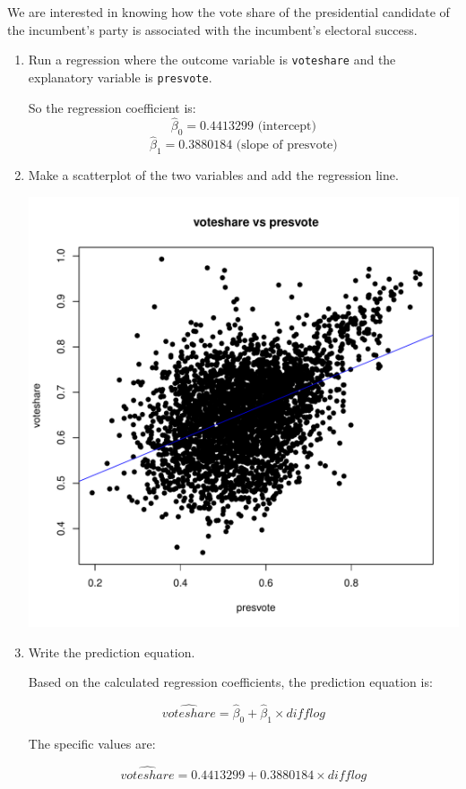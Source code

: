 \documentclass[12pt,letterpaper]{article}
\begin{document}
\noindent We are interested in knowing how the vote share of the presidential candidate of the incumbent's party is associated with the incumbent's electoral success.
	\vspace{.25cm}
	\begin{enumerate}
		\item Run a regression where the outcome variable is \texttt{voteshare} and the explanatory variable is \texttt{presvote}.
		
		\vspace{.5cm}
		 
		So the regression coefficient is:\\
		$$
		\hat{\beta}_0 = 0.4413299 \text{ (intercept)}
		$$
		$$
		\hat{\beta}_1 = 0.3880184 \text{ (slope of presvote)}
		$$
		\vspace{.5cm}
		
		\item Make a scatterplot of the two variables and add the regression line. 
			
	    	\vspace{.5cm}
			 
			\begin{center}
				\includegraphics[width=0.7\linewidth]{"scatter_plot3"}
			\end{center}
			
		\item Write the prediction equation.
		
		\vspace{.5cm}
		Based on the calculated regression coefficients, the prediction equation is:
		
		$$
		\hat{voteshare} = \hat{\beta}_0 + \hat{\beta}_1 \times difflog
		$$
		
		The specific values are:
		
		$$
		\hat{voteshare} = 0.4413299 + 0.3880184 \times difflog
		$$
		
	\end{enumerate}
	
\end{document}
